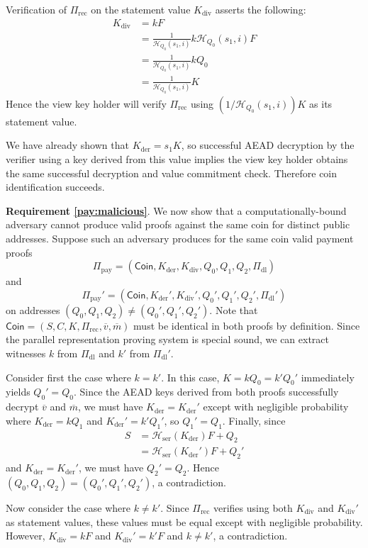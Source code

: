 \documentclass{llncs}
\newcommand{\hash}{\mathcal{H}}
\begin{document}
Verification of $\Pi_{\text{rec}}$ on the statement value $K_{\text{div}}$ asserts the following:
\begin{align*}
    K_{\text{div}} &= kF \\
    &= \frac{1}{\hash_{Q_0}(s_1,i)}k\hash_{Q_0}(s_1,i)F \\
    &= \frac{1}{\hash_{Q_0}(s_1,i)}kQ_0 \\
    &= \frac{1}{\hash_{Q_0}(s_1,i)}K
\end{align*}
Hence the view key holder will verify $\Pi_{\text{rec}}$ using $(1/\hash_{Q_0}(s_1,i))K$ as its statement value.

We have already shown that $K_{\text{der}} = s_1 K$, so successful AEAD decryption by the verifier using a key derived from this value implies the view key holder obtains the same successful decryption and value commitment check.
Therefore coin identification succeeds.

\textbf{Requirement \ref{pay:malicious}}. We now show that a computationally-bound adversary cannot produce valid proofs against the same coin for distinct public addresses.
Suppose such an adversary produces for the same coin valid payment proofs
$$\Pi_{\text{pay}} = (\mathsf{Coin},K_{\text{der}},K_{\text{div}},Q_0,Q_1,Q_2,\Pi_{\text{dl}})$$
and
$$\Pi_{\text{pay}}' = (\mathsf{Coin},K_{\text{der}}',K_{\text{div}}',Q_0',Q_1',Q_2',\Pi_{\text{dl}}')$$
on addresses $(Q_0,Q_1,Q_2) \neq (Q_0',Q_1',Q_2')$.
Note that $\mathsf{Coin} = (S,C,K,\Pi_{\text{rec}},\overline{v},\overline{m})$ must be identical in both proofs by definition.
Since the parallel representation proving system is special sound, we can extract witnesses $k$ from $\Pi_{\text{dl}}$ and $k'$ from $\Pi_{\text{dl}}'$.

Consider first the case where $k = k'$.
In this case, $K = kQ_0 = k'Q_0'$ immediately yields $Q_0' = Q_0$.
Since the AEAD keys derived from both proofs successfully decrypt $\overline{v}$ and $\overline{m}$, we must have $K_{\text{der}} = K_{\text{der}}'$ except with negligible probability where $K_{\text{der}} = kQ_1$ and $K_{\text{der}}' = k'Q_1'$, so $Q_1' = Q_1$.
Finally, since
\begin{align*}
S &= \hash_{\text{ser}}(K_{\text{der}})F + Q_2 \\
&= \hash_{\text{ser}}(K_{\text{der}}')F + Q_2'
\end{align*}
and $K_{\text{der}} = K_{\text{der}}'$, we must have $Q_2' = Q_2$.
Hence $(Q_0,Q_1,Q_2) = (Q_0',Q_1',Q_2')$, a contradiction.

Now consider the case where $k \neq k'$.
Since $\Pi_{\text{rec}}$ verifies using both $K_{\text{div}}$ and $K_{\text{div}}'$ as statement values, these values must be equal except with negligible probability.
However, $K_{\text{div}} = kF$ and $K_{\text{div}}' = k'F$ and $k \neq k'$, a contradiction.
\end{document}

